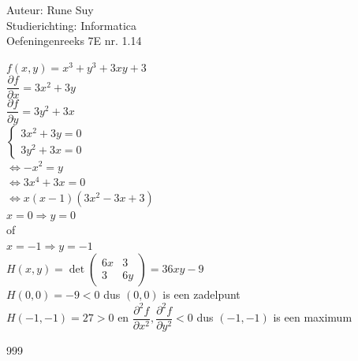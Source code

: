 \documentclass[a4paper]{article}
\begin{document}
  
\noindent \large Auteur: Rune Suy \\
\noindent \large Studierichting: Informatica\\
\noindent \large Oefeningenreeks 7E nr. 1.14\\

\medskip

\normalsize

$f(x,y) = x^3 + y^3 + 3xy + 3$\\

$\dfrac{\partial f}{\partial x} = 3x^2 + 3y$\\

$\dfrac{\partial f}{\partial y} = 3y^2 + 3x$\\

$\left\{
    \begin{array}{l}
        3x^2 + 3y = 0\\
        3y^2 + 3x = 0
    \end{array}
\right.$\\

$\Leftrightarrow -x^2 = y$\\

$\Leftrightarrow 3x^4+3x=0$\\

$\Leftrightarrow x(x-1)(3x^2 - 3x + 3)$\\

$x = 0 \Rightarrow y=0$\\

of\\

$x=-1 \Rightarrow y=-1$\\

$H(x,y) = \det \left(\begin{array}{cc}
    6x & 3\\
    3 & 6y
\end{array}\right) = 36xy-9$\\

$H(0,0) = -9 < 0$ dus $(0,0)$ is een zadelpunt\\

$H(-1,-1) = 27 > 0$ en $\dfrac{\partial^2 f}{\partial x^2}, \dfrac{\partial^2 f}{\partial y^2} < 0$ dus $(-1,-1)$ is een maximum\\

\begin{thebibliography}{999}
\end{thebibliography}
\end{document}
